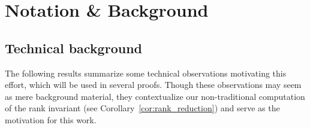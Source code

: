 \documentclass[10pt]{article}
\numberwithin{equation}{section}
\newcommand{\+}{%
	\raisebox{0.18ex}{\scaleobj{0.55}{+}}
}
\theoremstyle{definition}
\theoremstyle{definition}
\begin{document}
\section{Notation \& Background}\label{sec:background_notation}


\subsection{Technical background}\label{sec:betti_derivation}

The following results summarize some technical observations motivating this effort, which will be used in several proofs. Though these observations may seem as mere background material, they contextualize our non-traditional computation of the rank invariant (see Corollary~\ref{cor:rank_reduction}) and serve as the motivation for this work.  
\end{document}
